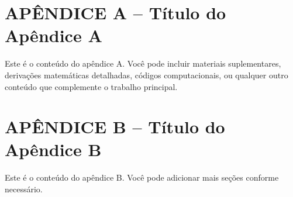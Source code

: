 
\chapter*{APÊNDICE A -- Título do Apêndice A}

\begin{mytext}

Este é o conteúdo do apêndice A. Você pode incluir materiais suplementares, derivações matemáticas detalhadas, códigos computacionais, ou qualquer outro conteúdo que complemente o trabalho principal.

\lipsum[1-2]

\end{mytext}

\chapter*{APÊNDICE B -- Título do Apêndice B}

\begin{mytext}

Este é o conteúdo do apêndice B. Você pode adicionar mais seções conforme necessário.

\lipsum[3-4]

\end{mytext}

% 
